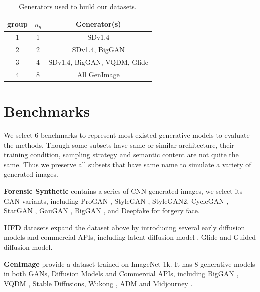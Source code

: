 \begin{table}[h]
    \centering
    \begin{tabular}{c|c|c}
    \toprule
     group & $n_g$ & Generator(s) \\ 
     \midrule
        1 &  1  & SDv1.4 \\
        2 &  2  & SDv1.4, BigGAN \\ 
        3 &  4 &  SDv1.4, BigGAN, VQDM, Glide \\
        4 &  8 & All GenImage \\
        \bottomrule
    \end{tabular}
    \caption{Generators used to build our datasets.}
    \label{tab:toydataset}
\end{table}

\section{Benchmarks}
\label{sec:benchmark}

We select 6 benchmarks to represent most existed generative models to evaluate the methods. Though some subsets have same or similar architecture, their training condition, sampling strategy and semantic content are not quite the same. Thus we preserve all subsets that have same name to simulate a variety of generated images.

\vspace{2mm}
\noindent
\textbf{Forensic Synthetic} \cite{wang2020cnn} contains a series of CNN-generated images, we select its GAN variants, including ProGAN \cite{karras2018progressive}, StyleGAN \cite{karras2019style}, StyleGAN2, CycleGAN \cite{CycleGAN}, StarGAN \cite{choi2018stargan}, GauGAN \cite{GauGAN}, BigGAN \cite{BigGAN}, and Deepfake \cite{Deepfake} for forgery face.

\vspace{2mm}
\noindent
\textbf{UFD} \cite{ojha2023towards} datasets expand the dataset above by introducing several early diffusion models and commercial APIs, including latent diffusion model \cite{rombach2022high}, Glide \cite{nichol2021glide} and Guided \cite{dhariwal2021diffusion} diffusion model.

\vspace{2mm}
\noindent
\textbf{GenImage} \cite{zhu2024genimage} provide a dataset trained on ImageNet-1k. It has 8 generative models in both GANs, Diffusion Models and Commercial APIs, including BigGAN \cite{BigGAN}, VQDM \cite{gu2022vector}, Stable Diffusions, Wukong \cite{Wukong}, ADM \cite{dhariwal2021diffusion} and Midjourney \cite{Midjourney}.

